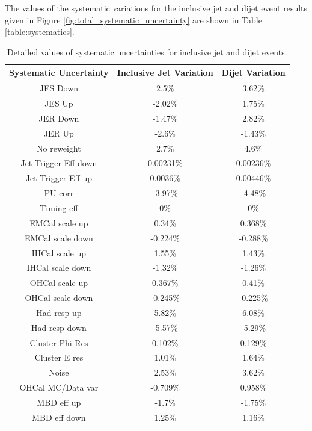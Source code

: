 The values of the systematic variations for the inclusive jet and dijet event results given in Figure \ref{fig:total_systematic_uncertainty} are shown in Table \ref{table:systematics}.
\begin{table}[ht]
\centering
\begin{tabular}{|c|c|c|}
\hline
Systematic Uncertainty & Inclusive Jet Variation & Dijet Variation \\ \hline
JES Down & 2.5\% & 3.62\% \\ \hline 
JES Up & -2.02\% & 1.75\% \\ \hline 
JER Down & -1.47\% & 2.82\% \\ \hline 
JER Up & -2.6\% & -1.43\% \\ \hline 
No reweight & 2.7\% & 4.6\% \\ \hline 
Jet Trigger Eff down & 0.00231\% & 0.00236\% \\ \hline 
Jet Trigger Eff up & 0.0036\% & 0.00446\% \\ \hline 
PU corr & -3.97\% & -4.48\% \\ \hline 
Timing eff & 0\% & 0\% \\ \hline 
EMCal scale up & 0.34\% & 0.368\% \\ \hline 
EMCal scale down & -0.224\% & -0.288\% \\ \hline 
IHCal scale up & 1.55\% & 1.43\% \\ \hline 
IHCal scale down & -1.32\% & -1.26\% \\ \hline 
OHCal scale up & 0.367\% & 0.41\% \\ \hline 
OHCal scale down & -0.245\% & -0.225\% \\ \hline 
Had resp up & 5.82\% & 6.08\% \\ \hline 
Had resp down & -5.57\% & -5.29\% \\ \hline 
Cluster Phi Res & 0.102\% & 0.129\% \\ \hline 
Cluster E res & 1.01\% & 1.64\% \\ \hline 
Noise & 2.53\% & 3.62\% \\ \hline 
OHCal MC/Data var & -0.709\% & 0.958\% \\ \hline 
MBD eff up & -1.7\% & -1.75\% \\ \hline 
MBD eff down & 1.25\% & 1.16\% \\ \hline 
\end{tabular}
\caption{Detailed values of systematic uncertainties for inclusive jet and dijet events.}
\end{table}
\label{table:systematics}

